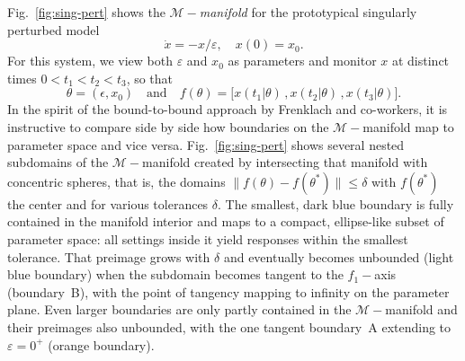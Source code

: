 Fig.~\ref{fig:sing-pert} shows the $\mathcal{M}-$\emph{manifold} for
the prototypical singularly perturbed model
% 
\begin{equation}
  \dot{x} = -x/\varepsilon, \quad
  x(0) = x_0 .
  \label{1D-model-singpert}
\end{equation}
For this system, we view both $\varepsilon$ and $x_0$ as parameters
and monitor $x$ at distinct times $0 < t_1 < t_2 < t_3$, so that
% 
\begin{equation}
  \theta = (\epsilon , x_0)
  \quad\mbox{and}\quad
  f(\theta)
  =
  \big[
  x(t_1 \vert \theta) \, ,
  x(t_2 \vert \theta) \, ,
  x(t_3 \vert \theta)
  \big] . 
  \label{1D-pf}
\end{equation}
% 
In the spirit of the bound-to-bound approach by Frenklach and
co-workers, it is instructive to compare side by side how boundaries
on the $\mathcal{M}-$manifold map to parameter space and vice versa.
Fig.~\ref{fig:sing-pert} shows several nested subdomains of the
$\mathcal{M}-$manifold created by intersecting that manifold with
concentric spheres, that is, the domains
$\|f(\theta) - f(\theta^*)\| \le \delta$
with $f(\theta^*)$ the center and for various tolerances
$\delta$.  The smallest, dark blue boundary is fully contained in the
manifold interior and maps to a compact, ellipse-like subset of
parameter space: all settings inside it yield responses within the
smallest tolerance.  That preimage grows with $\delta$ and eventually
becomes unbounded (light blue boundary) when the subdomain becomes
tangent to the $f_1-$axis (boundary~B), with the point of
tangency mapping to infinity on the parameter plane.  Even larger
boundaries are only partly contained in the $\mathcal{M}-$manifold and
their preimages also unbounded, with the one tangent boundary~A
extending to $\varepsilon=0^+$ (orange boundary).


